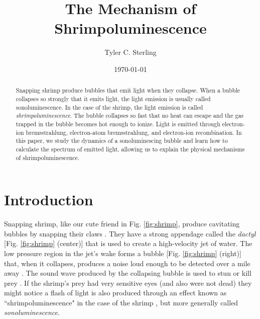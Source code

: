\documentclass[11pt,prb,aps,nofootinbib,superscriptaddress,floatfix]{revtex4-2}
\begin{document}
\title{The Mechanism of Shrimpoluminescence}

\author{Tyler C. Sterling}

\date{\today}

\begin{abstract}
Snapping shrimp produce bubbles that emit light when they collapse. When a bubble collapses so strongly that it emits light, the light emission is usually called sonoluminescence. In the case of the shrimp, the light emission is called \emph{shrimpoluminescence}. The bubble collapses so fast that no heat can escape and the gas trapped in the bubble becomes hot enough to ionize. Light is emitted through electron-ion bremsstrahlung, electron-atom bremsstrahlung, and electron-ion recombination. In this paper, we study the dynamics of a sonoluminescing bubble and learn how to calculate the spectrum of emitted light, allowing us to explain the physical mechanisms of shrimpoluminescence.
\end{abstract}

\maketitle

\section{Introduction}

Snapping shrimp, like our cute friend in Fig. \ref{fig:shrimp}, produce cavitating bubbles by snapping their claws \cite{versluis2000snapping,lohse2001snapping,tang2019bioinspired}. They have a strong appendage called the \emph{dactyl} [Fig. \ref{fig:shrimp} (center)] that is used to create a high-velocity jet of water. The low pressure region in the jet's wake forms a bubble [Fig. \ref{fig:shrimp} (right)] that, when it collapses, produces a noise loud enough to be detected over a mile away \cite{everest1948acoustical}. The sound wave produced by the collapsing bubble is used to stun or kill prey \cite{versluis2000snapping}. If the shrimp's prey had very sensitive eyes (and also were not dead) they might notice a flash of light is also produced through an effect known as ``shrimpoluminescence" in the case of the shrimp \cite{lohse2001snapping}, but more generally called \emph{sonoluminescence}.
\end{document}
